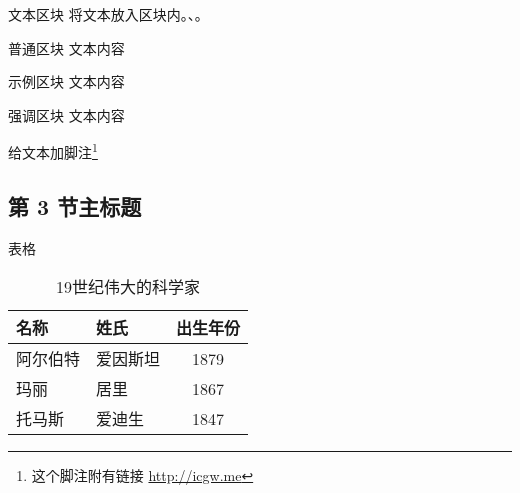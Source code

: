\documentclass[]{beamer}
\begin{document}
\begin{frame}{文本区块}
	将文本放入区块内。、。
	\begin{block}{普通区块}
		文本内容
	\end{block}
	\begin{exampleblock}{示例区块}
		文本内容
	\end{exampleblock}
	\begin{alertblock}{强调区块}
		文本内容
	\end{alertblock}
	给文本加脚注\footnote{这个脚注附有链接 \url{http://icgw.me}}
\end{frame}


\subsection[第 3 节缩写标题]{第 3 节主标题}

\begin{frame}{表格}
	\begin{table}
		\begin{tabular}{llc}
			名称     & 姓氏     & 出生年份 \\ \midrule
			阿尔伯特 & 爱因斯坦 & 1879     \\
			玛丽     & 居里     & 1867     \\
			托马斯   & 爱迪生   & 1847     \\
		\end{tabular}
		\caption{19世纪伟大的科学家}
	\end{table}
\end{frame}
\end{document}
